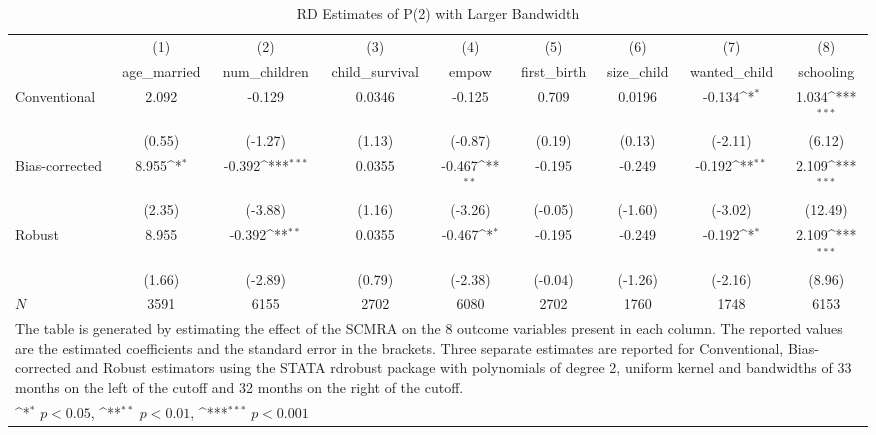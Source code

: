 \begin{table}[htbp]\centering
\def\sym#1{\ifmmode^{#1}\else\(^{#1}\)\fi}
\caption{RD Estimates of P(2) with Larger Bandwidth}
\begin{tabular}{l*{8}{c}}
\toprule
            &\multicolumn{1}{c}{(1)}&\multicolumn{1}{c}{(2)}&\multicolumn{1}{c}{(3)}&\multicolumn{1}{c}{(4)}&\multicolumn{1}{c}{(5)}&\multicolumn{1}{c}{(6)}&\multicolumn{1}{c}{(7)}&\multicolumn{1}{c}{(8)}\\
            &\multicolumn{1}{c}{age\_married}&\multicolumn{1}{c}{num\_children}&\multicolumn{1}{c}{child\_survival}&\multicolumn{1}{c}{empow}&\multicolumn{1}{c}{first\_birth}&\multicolumn{1}{c}{size\_child}&\multicolumn{1}{c}{wanted\_child}&\multicolumn{1}{c}{schooling}\\
\midrule
Conventional&       2.092         &      -0.129         &      0.0346         &      -0.125         &       0.709         &      0.0196         &      -0.134\sym{*}  &       1.034\sym{***}\\
            &      (0.55)         &     (-1.27)         &      (1.13)         &     (-0.87)         &      (0.19)         &      (0.13)         &     (-2.11)         &      (6.12)         \\
\addlinespace
Bias-corrected&       8.955\sym{*}  &      -0.392\sym{***}&      0.0355         &      -0.467\sym{**} &      -0.195         &      -0.249         &      -0.192\sym{**} &       2.109\sym{***}\\
            &      (2.35)         &     (-3.88)         &      (1.16)         &     (-3.26)         &     (-0.05)         &     (-1.60)         &     (-3.02)         &     (12.49)         \\
\addlinespace
Robust      &       8.955         &      -0.392\sym{**} &      0.0355         &      -0.467\sym{*}  &      -0.195         &      -0.249         &      -0.192\sym{*}  &       2.109\sym{***}\\
            &      (1.66)         &     (-2.89)         &      (0.79)         &     (-2.38)         &     (-0.04)         &     (-1.26)         &     (-2.16)         &      (8.96)         \\
\midrule
\(N\)       &        3591         &        6155         &        2702         &        6080         &        2702         &        1760         &        1748         &        6153         \\
\bottomrule
\multicolumn{9}{l}{\footnotesize The table is generated by estimating the effect of the SCMRA on the 8 outcome variables present in each column. The reported values are the estimated coefficients and the standard error in the brackets. Three separate estimates are reported for Conventional, Bias-corrected and Robust estimators using the STATA rdrobust package with polynomials of degree 2, uniform kernel and bandwidths of 33 months on the left of the cutoff and 32 months on the right of the cutoff.}\\
\multicolumn{9}{l}{\footnotesize \sym{*} \(p<0.05\), \sym{**} \(p<0.01\), \sym{***} \(p<0.001\)}\\
\end{tabular}
\end{table}
